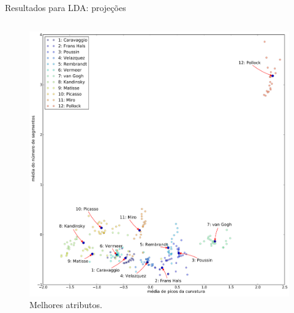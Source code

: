 \documentclass{beamer}
\begin{document}


\begin{frame}{Resultados para LDA: projeções}

  \begin{columns}

   \begin{column}{.49\textwidth}
\begin{figure}[h!]
\begin{center}
\includegraphics[width=\columnwidth]{figs/caso1_g1}
        \caption{Melhores atributos.}
\end{center}
\end{figure}
\end{column}



\end{columns}
\end{frame}
\end{document}
